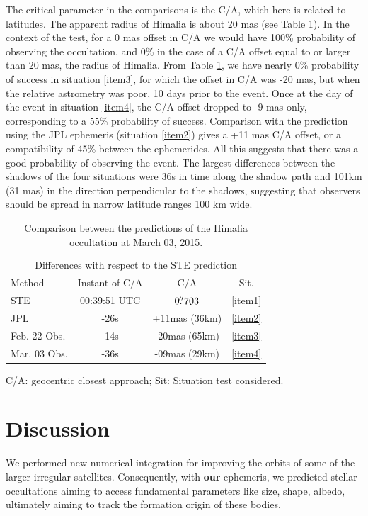 \documentclass[useAMS,usenatbib]{mn2e}
\begin{document}
The critical parameter in the comparisons is the C/A, which here is related to latitudes. The apparent radius of Himalia is about 20 mas (see Table 1). In the context of the test, for a 0 mas offset in C/A we would have 100\% probability of observing the occultation, and 0\% in the case of a C/A offset equal to or larger than 20 mas, the radius of Himalia. From Table \ref{Tab: comparison-Himalia}, we have nearly 0\% probability of success in situation \ref{item3}, for which the offset in C/A was -20 mas, but when the relative astrometry was poor, 10 days prior to the event. Once at the day of the event in situation \ref{item4}, the C/A offset dropped to -9 mas only, corresponding to a 55\% probability of success. Comparison with the prediction using the JPL ephemeris (situation \ref{item2}) gives a +11 mas C/A offset, or a compatibility of 45\% between the ephemerides. All this suggests that there was a good probability of observing the event. The largest differences between the shadows of the four situations were 36s in time along the shadow path and 101km (31 mas) in the direction perpendicular to the shadows, suggesting that observers should be spread in narrow latitude ranges 100 km wide.

\begin{table}
\caption{\label{Tab: comparison-Himalia} Comparison between the predictions of the Himalia occultation at March 03, 2015.}
\begin{centering}
\begin{tabular}{lccc}
\hline  \hline
\multicolumn{4}{c}{Differences with respect to the STE prediction} \tabularnewline
Method  & Instant of C/A  & C/A & Sit.   \tabularnewline
\hline
STE & 00:39:51 UTC & $0\hbox{$.\!\!^{\prime\prime}$}703$ & \ref{item1} \tabularnewline
JPL & -26s & +11mas (36km) & \ref{item2} \tabularnewline %
Feb. 22 Obs. & -14s & -20mas (65km) & \ref{item3} \tabularnewline %
Mar. 03 Obs. & -36s & -09mas (29km) & \ref{item4} \tabularnewline %
\hline
\end{tabular}
\par\end{centering}
C/A: geocentric closest approach; Sit: Situation test considered.
\end{table}

\section{Discussion} \label{Sec: discussion}

We performed new numerical integration for improving the orbits of some of the larger irregular satellites. Consequently, with \textbf{our} ephemeris, we predicted stellar occultations aiming to access fundamental parameters like size, shape, albedo, ultimately aiming to track the formation origin of these bodies.
\end{document}
